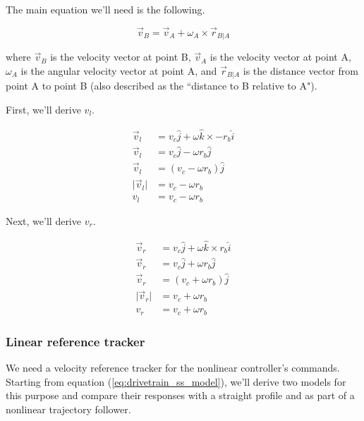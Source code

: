 The main equation we'll need is the following.

\begin{equation*}
  \vec{v}_B = \vec{v}_A + \omega_A \times \vec{r}_{B|A}
\end{equation*}

where $\vec{v}_B$ is the velocity vector at point B, $\vec{v}_A$ is the velocity
vector at point A, $\omega_A$ is the angular velocity vector at point A, and
$\vec{r}_{B|A}$ is the distance vector from point A to point B (also described
as the ``distance to B relative to A").

First, we'll derive $v_l$.

\begin{align}
  \vec{v}_l &= v_c \hat{j} + \omega \hat{k} \times -r_b \hat{i} \nonumber \\
  \vec{v}_l &= v_c \hat{j} - \omega r_b \hat{j} \nonumber \\
  \vec{v}_l &= (v_c - \omega r_b) \hat{j} \nonumber \\
  \lvert\vec{v}_l\rvert &= v_c - \omega r_b \nonumber \\
  v_l &= v_c - \omega r_b \label{eq:diff_vl}
\end{align}

Next, we'll derive $v_r$.

\begin{align}
  \vec{v}_r &= v_c \hat{j} + \omega \hat{k} \times r_b \hat{i} \nonumber
    \\
  \vec{v}_r &= v_c \hat{j} + \omega r_b \hat{j} \nonumber \\
  \vec{v}_r &= (v_c + \omega r_b) \hat{j} \nonumber \\
  \lvert\vec{v}_r\rvert &= v_c + \omega r_b \nonumber \\
  v_r &= v_c + \omega r_b \label{eq:diff_vr}
\end{align}

\subsubsection{Linear reference tracker}

We need a velocity \gls{reference} tracker for the nonlinear \gls{controller}'s
commands. Starting from equation (\ref{eq:drivetrain_ss_model}), we'll derive
two \glspl{model} for this purpose and compare their responses with a straight
profile and as part of a nonlinear trajectory follower.

